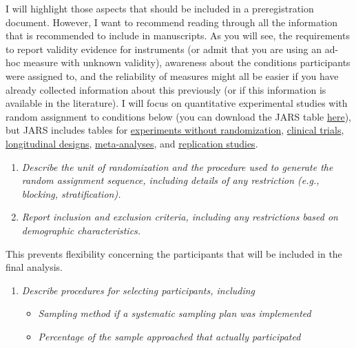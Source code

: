 \documentclass[
  oneside]{krantz}
\providecommand{\tightlist}{%
  \setlength{\itemsep}{0pt}\setlength{\parskip}{0pt}}
\begin{document}
I will highlight those aspects that should be included in a preregistration document. However, I want to recommend reading through all the information that is recommended to include in manuscripts. As you will see, the requirements to report validity evidence for instruments (or admit that you are using an ad-hoc measure with unknown validity), awareness about the conditions participants were assigned to, and the reliability of measures might all be easier if you have already collected information about this previously (or if this information is available in the literature). I will focus on quantitative experimental studies with random assignment to conditions below (you can download the JARS table \href{https://apastyle.apa.org/jars/quant-table-1.pdf}{here}), but JARS includes tables for \href{https://apastyle.apa.org/jars/quant-table-2b.pdf}{experiments without randomization}, \href{https://apastyle.apa.org/jars/quant-table-2c.pdf}{clinical trials}, \href{https://apastyle.apa.org/jars/quant-table-4.pdf}{longitudinal designs}, \href{https://apastyle.apa.org/jars/quant-table-9.pdf}{meta-analyses}, and \href{https://apastyle.apa.org/jars/quant-table-6.pdf}{replication studies}.

\begin{enumerate}
\def\labelenumi{\arabic{enumi}.}
\item
  \emph{Describe the unit of randomization and the procedure used to generate the random assignment sequence, including details of any restriction (e.g., blocking, stratification).}
\item
  \emph{Report inclusion and exclusion criteria, including any restrictions based on demographic characteristics.}
\end{enumerate}

This prevents flexibility concerning the participants that will be included in the final analysis.

\begin{enumerate}
\def\labelenumi{\arabic{enumi}.}
\setcounter{enumi}{2}
\tightlist
\item
  \emph{Describe procedures for selecting participants, including}

  \begin{itemize}
  \tightlist
  \item
    \emph{Sampling method if a systematic sampling plan was implemented}
  \item
    \emph{Percentage of the sample approached that actually participated}
  \end{itemize}
\end{enumerate}
\end{document}
